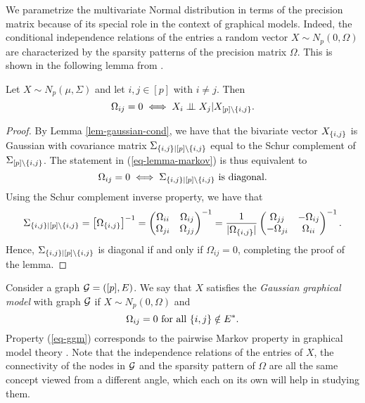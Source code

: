 We parametrize the multivariate Normal distribution in terms of the precision matrix because of its special role in the context of graphical models. Indeed, the conditional independence relations of the entries a random vector $X \sim N_p(0, \Omega)$ are characterized by the sparsity patterns of the precision matrix $\Omega$. This is shown in the following lemma from \cite[Proposition 5.2]{lauritzen1996}.
\
\begin{lemma}
    Let $X \sim N_p(\mu, \Sigma)$ and let $i, j \in [p]$ with $i \neq j$. Then
    \begin{equation} \label{eq-lemma-markov}
        \Omega_{ij} = 0 \iff X_i \perp\mkern-9.5mu\perp X_j | X_{[p] \setminus {\left\{i,j\right\}}}.
    \end{equation}
\end{lemma}
\begin{proof}
    By Lemma \ref{lem-gaussian-cond}, we have that the bivariate vector $X_{{\left\{i,j\right\}}}$ is Gaussian with covariance matrix $\Sigma_{{\left\{i,j\right\}}|[p]\setminus{\left\{i,j\right\}}}$ equal to the Schur complement of $\Sigma_{[p] \setminus {\left\{i,j\right\}}}$. The statement in (\ref{eq-lemma-markov}) is thus equivalent to 
    \begin{equation*}
        \Omega_{ij} = 0 \iff \Sigma_{{\left\{i,j\right\}}|[p]\setminus{\left\{i,j\right\}}}\ {\textrm{is diagonal}}.
    \end{equation*}
    Using the Schur complement inverse property, we have that
    \begin{equation*}
        \Sigma_{{\left\{i,j\right\}}|[p]\setminus{\left\{i,j\right\}}} 
        = \left[\Omega_{{\left\{i,j\right\}}}\right]^{-1} 
        = \begin{pmatrix}
            \Omega_{ii} & \Omega_{ij}\\
            \Omega_{ji} & \Omega_{jj}
            \end{pmatrix}^{-1}
        = \frac{1}{|\Omega_{{\left\{i,j\right\}}}|} \begin{pmatrix}
            \Omega_{jj} & -\Omega_{ij}\\
            -\Omega_{ji} & \Omega_{ii} 
            \end{pmatrix}^{-1}.
    \end{equation*}
    Hence, $\Sigma_{{\left\{i,j\right\}}|[p]\setminus{\left\{i,j\right\}}}$ is diagonal if and only if $\Omega_{ij} = 0$, completing the proof of the lemma.
\end{proof}

Consider a graph ${\mathcal{G}} = ([p], E)$. We say that $X$ satisfies the \textit{Gaussian graphical model} with graph ${\mathcal{G}}$ if $X \sim N_p(0, \Omega)$ and
\begin{equation} \label{eq-ggm}
    \Omega_{i j} = 0 {\textrm{ for all }} {\left\{i,j\right\}} \notin E^*.
\end{equation}
Property (\ref{eq-ggm}) corresponds to the pairwise Markov property in graphical model theory \cite{lauritzen1996}. Note that the independence relations of the entries of $X$, the connectivity of the nodes in ${\mathcal{G}}$ and the sparsity pattern of $\Omega$ are all the same concept viewed from a different angle, which each on its own will help in studying them.

